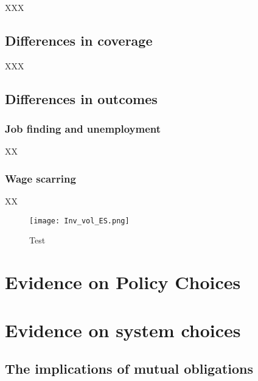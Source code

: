 \documentclass[
  letterpaper,
  DIV=11,
  numbers=noendperiod]{scrreprt}
\begin{document}
XXX

\hypertarget{differences-in-coverage}{%
\section{Differences in coverage}\label{differences-in-coverage}}

XXX

\hypertarget{differences-in-outcomes}{%
\section{Differences in outcomes}\label{differences-in-outcomes}}

\hypertarget{job-finding-and-unemployment}{%
\subsection{Job finding and
unemployment}\label{job-finding-and-unemployment}}

XX

\hypertarget{wage-scarring}{%
\subsection{Wage scarring}\label{wage-scarring}}

XX

\begin{figure}

{\centering \texttt{[image: Inv\_vol\_ES.png]}

}

\caption{Test}

\end{figure}


\hypertarget{evidence-on-policy-choices}{%
\chapter{Evidence on Policy Choices}\label{evidence-on-policy-choices}}


\hypertarget{evidence-on-system-choices}{%
\chapter{Evidence on system choices}\label{evidence-on-system-choices}}

\hypertarget{the-implications-of-mutual-obligations}{%
\section{The implications of mutual
obligations}\label{the-implications-of-mutual-obligations}}
\end{document}
